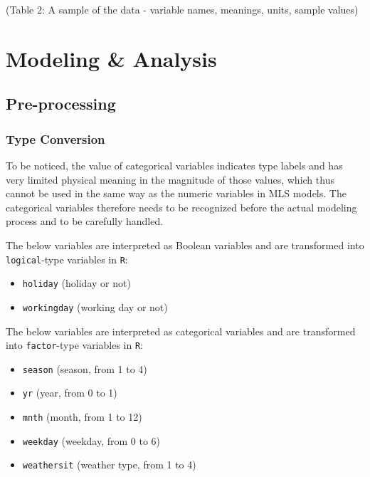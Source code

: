 \documentclass[
  twocolumn]{article}
\providecommand{\tightlist}{%
  \setlength{\itemsep}{0pt}\setlength{\parskip}{0pt}}
\begin{document}
(Table 2: A sample of the data - variable names, meanings, units, sample
values)

\hypertarget{modeling-analysis}{%
\section{Modeling \& Analysis}\label{modeling-analysis}}

\hypertarget{pre-processing}{%
\subsection{Pre-processing}\label{pre-processing}}

\hypertarget{type-conversion}{%
\subsubsection{Type Conversion}\label{type-conversion}}

To be noticed, the value of categorical variables indicates type labels
and has very limited physical meaning in the magnitude of those values,
which thus cannot be used in the same way as the numeric variables in
MLS models. The categorical variables therefore needs to be recognized
before the actual modeling process and to be carefully handled.

The below variables are interpreted as Boolean variables and are
transformed into \texttt{logical}-type variables in \texttt{R}:

\begin{itemize}
\tightlist
\item
  \texttt{holiday} (holiday or not)
\item
  \texttt{workingday} (working day or not)
\end{itemize}

The below variables are interpreted as categorical variables and are
transformed into \texttt{factor}-type variables in \texttt{R}:

\begin{itemize}
\tightlist
\item
  \texttt{season} (season, from 1 to 4)
\item
  \texttt{yr} (year, from 0 to 1)
\item
  \texttt{mnth} (month, from 1 to 12)
\item
  \texttt{weekday} (weekday, from 0 to 6)
\item
  \texttt{weathersit} (weather type, from 1 to 4)
\end{itemize}
\end{document}
